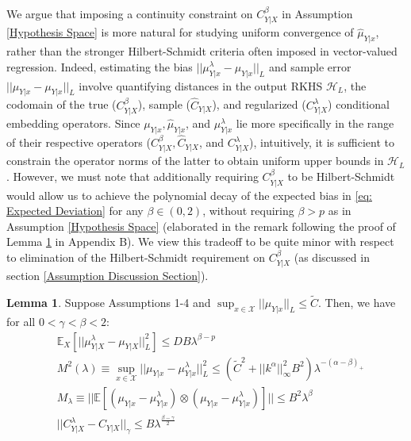 \documentclass[accepted]{article}
\theoremstyle{definition}
\newtheorem{lemma}[theorem]{Lemma}
\begin{document}
\par We argue that imposing a continuity constraint on $C^{\beta}_{Y|X}$ in Assumption \ref{Hypothesis Space} is more natural for studying uniform convergence of $\hat{\mu}_{Y|x}$, rather than the stronger Hilbert-Schmidt criteria often imposed in vector-valued regression. Indeed, estimating the bias $||\mu^{\lambda}_{Y|x} - \mu_{Y|x}||_{L}$ and sample error $||\hat{\mu}_{Y|x} - \mu_{Y|x}||_{L}$ involve quantifying distances in the output RKHS $\mathcal{H}_L$, the codomain of the true ($C^{\beta}_{Y|X}$), sample ($\hat{C}_{Y|X}$), and regularized ($C^{\lambda}_{Y|X}$) conditional embedding operators. Since $\mu_{Y|x}, \hat{\mu}_{Y|x}$, and $\mu^{\lambda}_{Y|x}$ lie more specifically in the range of their respective operators ($C^{\beta}_{Y|X}, \hat{C}_{Y|X}$, and $C^{\lambda}_{Y|X}$), intuitively, it is sufficient to constrain the operator norms of the latter to obtain uniform upper bounds in $\mathcal{H}_L$. However, we must note that additionally requiring $C^{\beta}_{Y|X}$ to be Hilbert-Schmidt would allow us to achieve the polynomial decay of the expected bias in \eqref{eq: Expected Deviation} for any $\beta \in (0, 2)$, without requiring $\beta > p$ as in Assumption \ref{Hypothesis Space} (elaborated in the remark following the proof of Lemma \ref{orders} in Appendix B). We view this tradeoff to be quite minor with respect to elimination of the Hilbert-Schmidt requirement on $C^{\beta}_{Y|X}$ (as discussed in section \ref{Assumption Discussion Section}). 
\begin{small}
\begin{lemma}
\label{orders}
Suppose Assumptions 1-4 and $\sup_{x \in \mathcal{X}} ||\mu_{Y|x}||_{L} \leq \tilde{C}$. Then, we have for all $0 < \gamma < \beta < 2$:
\begin{align}
   & \mathbb{E}_{X}[||\mu^{\lambda}_{Y|X} - \mu_{Y|X}||^2_{L}]   \leq DB\lambda^{\beta - p} \label{eq: Expected Deviation} \\
   & M^2(\lambda)  \equiv \sup_{x \in \mathcal{X}} ||\mu_{Y|x} - \mu^{\lambda}_{Y|x}||^2_{L} \leq (\tilde{C}^2 + ||k^{\alpha}||^2_{\infty}B^2)\lambda^{-(\alpha - \beta)_{+}} \label{eq: Max Deviation} \\
   & M_{\lambda} \equiv ||\mathbb{E}[(\mu_{Y|x} - \mu^{\lambda}_{Y|x}) \otimes (\mu_{Y|x} - \mu^{\lambda}_{Y|x})]|| \leq B^2\lambda^{\beta} \label{eq: Expected Deviation Norm}\\
   & ||C^{\lambda}_{Y|X} - C_{Y|X}||_{\gamma} \leq B\lambda^{\frac{\beta - \gamma}{2}} \label{eq: CME Deviation Norm}
\end{align}
\end{lemma}
\end{small}
\end{document}
